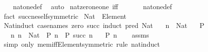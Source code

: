 \begin{isabellebody}
%
\isadelimproof
\ \ %
\endisadelimproof
%
\isatagproof
{}\isamarkupfalse%
\ nat{\isacharunderscore}{\kern0pt}one{\isacharunderscore}{\kern0pt}def\ \isamarkupfalse%
\ auto%
\endisatagproof
{\isafoldproof}%
%
\isadelimproof
\isanewline
%
\endisadelimproof
\isanewline
{}\isamarkupfalse%
\ nat{\isacharunderscore}{\kern0pt}zero{\isacharunderscore}{\kern0pt}ne{\isacharunderscore}{\kern0pt}one\ {\isacharbrackleft}{\kern0pt}iff{\isacharbrackright}{\kern0pt}{\isacharcolon}{\kern0pt}\ {\isachardoublequoteopen}{}\ {\isasymnoteq}\ {}{\isachardoublequoteclose}\isanewline
%
\isadelimproof
\ \ %
\endisadelimproof
%
\isatagproof
{}\isamarkupfalse%
\ nat{\isacharunderscore}{\kern0pt}one{\isacharunderscore}{\kern0pt}def\ \isamarkupfalse%
\ {\isacharparenleft}{\kern0pt}fact\ succ{\isacharunderscore}{\kern0pt}ne{\isacharunderscore}{\kern0pt}self{\isacharbrackleft}{\kern0pt}symmetric{\isacharbrackright}{\kern0pt}{\isacharparenright}{\kern0pt}%
\endisatagproof
{\isafoldproof}%
%
\isadelimproof
%
\endisadelimproof
%
\isadelimdocument
%
\endisadelimdocument
%
\isatagdocument
%
\isamarkuptrue%
%
\endisatagdocument
{\isafolddocument}%
%
\isadelimdocument
%
\endisadelimdocument
{}\isamarkupfalse%
\ {\isachardoublequoteopen}Nat\ {\isasymequiv}\ Element\ {\isasymnat}{\isachardoublequoteclose}\isanewline
\isanewline
\isanewline
{}\isamarkupfalse%
\ Nat{\isacharunderscore}{\kern0pt}induct\ {\isacharbrackleft}{\kern0pt}case{\isacharunderscore}{\kern0pt}names\ zero\ succ{\isacharcomma}{\kern0pt}\ induct\ pred{\isacharcolon}{\kern0pt}\ Nat{\isacharbrackright}{\kern0pt}{\isacharcolon}{\kern0pt}\isanewline
\ \ \ {\isachardoublequoteopen}n\ {\isacharcolon}{\kern0pt}\ Nat{\isachardoublequoteclose}\isanewline
\ \ \ {\isachardoublequoteopen}P\ {}{\isachardoublequoteclose}\isanewline
\ \ \ {\isachardoublequoteopen}{\isasymAnd}n{\isachardot}{\kern0pt}\ n\ {\isacharcolon}{\kern0pt}\ Nat\ {\isasymLongrightarrow}\ P\ n\ {\isasymLongrightarrow}\ P\ {\isacharparenleft}{\kern0pt}succ\ n{\isacharparenright}{\kern0pt}{\isachardoublequoteclose}\isanewline
\ \ \ {\isachardoublequoteopen}P\ n{\isachardoublequoteclose}\isanewline
%
\isadelimproof
\ \ %
\endisadelimproof
%
\isatagproof
{}\isamarkupfalse%
\ assms\ \isamarkupfalse%
\ {\isacharparenleft}{\kern0pt}simp\ only{\isacharcolon}{\kern0pt}\ mem{\isacharunderscore}{\kern0pt}iff{\isacharunderscore}{\kern0pt}Element{\isacharbrackleft}{\kern0pt}symmetric{\isacharbrackright}{\kern0pt}{\isacharparenright}{\kern0pt}\ {\isacharparenleft}{\kern0pt}rule\ nat{\isacharunderscore}{\kern0pt}induct{\isacharparenright}{\kern0pt}%

\end{isabellebody}
